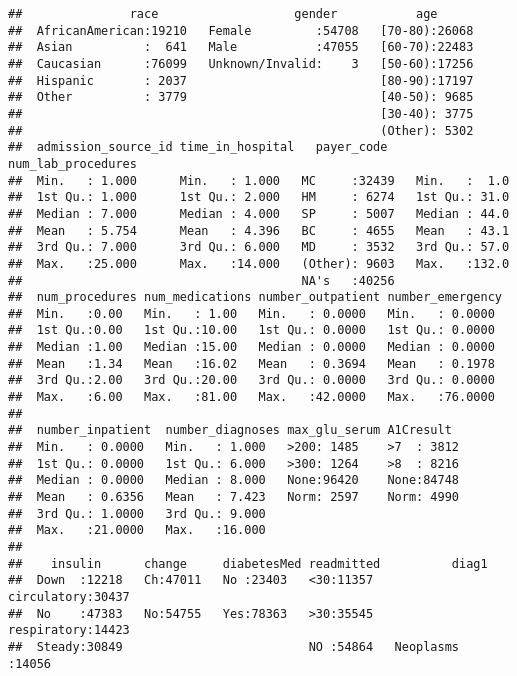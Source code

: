 \documentclass[]{article}
\begin{document}
\begin{verbatim}
##               race                   gender           age       
##  AfricanAmerican:19210   Female         :54708   [70-80):26068  
##  Asian          :  641   Male           :47055   [60-70):22483  
##  Caucasian      :76099   Unknown/Invalid:    3   [50-60):17256  
##  Hispanic       : 2037                           [80-90):17197  
##  Other          : 3779                           [40-50): 9685  
##                                                  [30-40): 3775  
##                                                  (Other): 5302  
##  admission_source_id time_in_hospital   payer_code    num_lab_procedures
##  Min.   : 1.000      Min.   : 1.000   MC     :32439   Min.   :  1.0     
##  1st Qu.: 1.000      1st Qu.: 2.000   HM     : 6274   1st Qu.: 31.0     
##  Median : 7.000      Median : 4.000   SP     : 5007   Median : 44.0     
##  Mean   : 5.754      Mean   : 4.396   BC     : 4655   Mean   : 43.1     
##  3rd Qu.: 7.000      3rd Qu.: 6.000   MD     : 3532   3rd Qu.: 57.0     
##  Max.   :25.000      Max.   :14.000   (Other): 9603   Max.   :132.0     
##                                       NA's   :40256                     
##  num_procedures num_medications number_outpatient number_emergency 
##  Min.   :0.00   Min.   : 1.00   Min.   : 0.0000   Min.   : 0.0000  
##  1st Qu.:0.00   1st Qu.:10.00   1st Qu.: 0.0000   1st Qu.: 0.0000  
##  Median :1.00   Median :15.00   Median : 0.0000   Median : 0.0000  
##  Mean   :1.34   Mean   :16.02   Mean   : 0.3694   Mean   : 0.1978  
##  3rd Qu.:2.00   3rd Qu.:20.00   3rd Qu.: 0.0000   3rd Qu.: 0.0000  
##  Max.   :6.00   Max.   :81.00   Max.   :42.0000   Max.   :76.0000  
##                                                                    
##  number_inpatient  number_diagnoses max_glu_serum A1Cresult   
##  Min.   : 0.0000   Min.   : 1.000   >200: 1485    >7  : 3812  
##  1st Qu.: 0.0000   1st Qu.: 6.000   >300: 1264    >8  : 8216  
##  Median : 0.0000   Median : 8.000   None:96420    None:84748  
##  Mean   : 0.6356   Mean   : 7.423   Norm: 2597    Norm: 4990  
##  3rd Qu.: 1.0000   3rd Qu.: 9.000                             
##  Max.   :21.0000   Max.   :16.000                             
##                                                               
##    insulin      change     diabetesMed readmitted          diag1      
##  Down  :12218   Ch:47011   No :23403   <30:11357   circulatory:30437  
##  No    :47383   No:54755   Yes:78363   >30:35545   respiratory:14423  
##  Steady:30849                          NO :54864   Neoplasms  :14056  

\end{verbatim}
\end{document}
